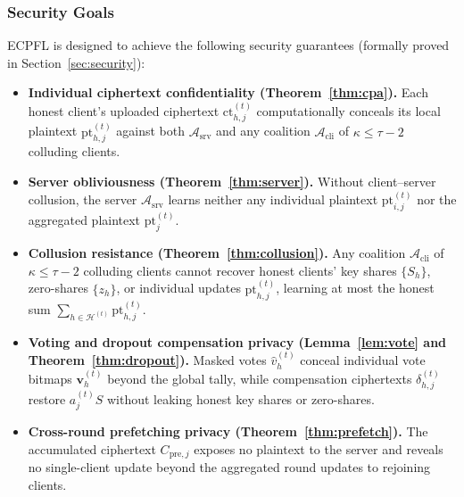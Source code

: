 \subsubsection{Security Goals}
\textsc{ECPFL} is designed to achieve the following security guarantees (formally proved in Section~\ref{sec:security}):
\begin{itemize}
 \item \textbf{Individual ciphertext confidentiality (Theorem~\ref{thm:cpa}).} Each honest client's uploaded ciphertext $\mathrm{ct}_{h,j}^{(t)}$ computationally conceals its local plaintext $\mathrm{pt}_{h,j}^{(t)}$ against both $\mathcal{A}_{\mathrm{srv}}$ and any coalition $\mathcal{A}_{\mathrm{cli}}$ of $\kappa \le \tau - 2$ colluding clients.

 \item \textbf{Server obliviousness (Theorem~\ref{thm:server}).} Without client--server collusion, the server $\mathcal{A}_{\mathrm{srv}}$ learns neither any individual plaintext $\mathrm{pt}_{i,j}^{(t)}$ nor the aggregated plaintext $\mathrm{pt}_j^{(t)}$.

 \item \textbf{Collusion resistance (Theorem~\ref{thm:collusion}).} Any coalition $\mathcal{A}_{\mathrm{cli}}$ of $\kappa \le \tau - 2$ colluding clients cannot recover honest clients' key shares $\{S_h\}$, zero-shares $\{z_h\}$, or individual updates $\mathrm{pt}_{h,j}^{(t)}$, learning at most the honest sum $\sum_{h \in \mathcal{H}^{(t)}} \mathrm{pt}_{h,j}^{(t)}$.

 \item \textbf{Voting and dropout compensation privacy (Lemma~\ref{lem:vote} and Theorem~\ref{thm:dropout}).} Masked votes $\hat{v}_h^{(t)}$ conceal individual vote bitmaps $\mathbf{v}_h^{(t)}$ beyond the global tally, while compensation ciphertexts $\delta_{h,j}^{(t)}$ restore $a_j^{(t)}S$ without leaking honest key shares or zero-shares.

 \item \textbf{Cross-round prefetching privacy (Theorem~\ref{thm:prefetch}).} The accumulated ciphertext $C_{\mathrm{pre},j}$ exposes no plaintext to the server and reveals no single-client update beyond the aggregated round updates to rejoining clients.
\end{itemize}

